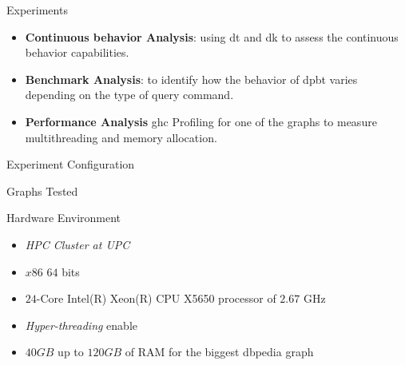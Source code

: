 \begin{frame}[fragile]{Experiments}
    \begin{itemize}
      \setlength\itemsep{2em}
      \item \textbf{Continuous behavior Analysis}: using \acrshort{dt} and \acrshort{dk} to assess the continuous behavior capabilities.
      \item \textbf{Benchmark Analysis}: to identify how the behavior of \acrshort{dpbt} varies depending on the type of query command.
      \item \textbf{Performance Analysis} \acrfull{ghc} Profiling for one of the graphs to measure multithreading and memory allocation. 
    \end{itemize}
\end{frame}

\begin{frame}[fragile]{Experiment Configuration}
  \begin{block}{Graphs Tested}
    \begin{table}[H]
      \centering
     \end{table}
  \end{block}
  \begin{block}{Hardware Environment}
    \begin{itemize}
          \item \emph{HPC Cluster at UPC}
          \item $x86$ $64$ bits
          \item $24$-Core Intel(R) Xeon(R) CPU X5650 processor of $2.67$ GHz
          \item \emph{Hyper-threading} enable
          \item $40 GB$ up to $120 GB$ of RAM for the biggest \acrfull{dbpedia} graph
      \end{itemize}        
  \end{block}
\end{frame}

